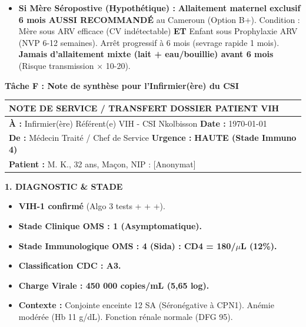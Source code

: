 \documentclass[11pt]{article}
\begin{document}
\begin{exoresolu}
\begin{enumerate}
\begin{itemize}
        \item \textbf{Si Mère Séropostive (Hypothétique) :} \textbf{Allaitement maternel exclusif 6 mois AUSSI RECOMMANDÉ} au Cameroun (Option B+). Condition : Mère sous ARV efficace (CV indétectable) \textbf{ET} Enfant sous Prophylaxie ARV (NVP 6-12 semaines). Arrêt progressif à 6 mois (sevrage rapide 1 mois). \textbf{Jamais d'allaitement mixte (lait + eau/bouillie) avant 6 mois} (Risque transmission $\times$ 10-20).
    \end{itemize}
\end{enumerate}

\noindent\textbf{Tâche F : Note de synthèse pour l'Infirmier(ère) du CSI}
\begin{center}
\begin{tabularx}{\linewidth}{|X|}\hline
\rowcolor{popblueL}
\textbf{NOTE DE SERVICE / TRANSFERT DOSSIER PATIENT VIH} \\ \hline
\textbf{À :} Infirmier(ère) Référent(e) VIH - CSI Nkolbisson \hfill \textbf{Date :} \today \\
\textbf{De :} Médecin Traité / Chef de Service \hfill \textbf{Urgence :} \textbf{HAUTE (Stade Immuno 4)} \\
\textbf{Patient :} M. K., 32 ans, Maçon, NIP : [Anonymat] \\ \hline
\end{tabularx}
\end{center}

\vspace{0.3cm}
\noindent\textbf{1. DIAGNOSTIC \& STADE}
\begin{itemize}
    \item \textbf{VIH-1 confirmé} (Algo 3 tests + + +).
    \item \textbf{Stade Clinique OMS : 1 (Asymptomatique).}
    \item \textbf{Stade Immunologique OMS : 4 (Sida) : CD4 = 180/$\mu$L (12\%).}
    \item \textbf{Classification CDC : A3.}
    \item \textbf{Charge Virale : 450 000 copies/mL (5,65 log).}
    \item \textbf{Contexte :} Conjointe enceinte 12 SA (Séronégative à CPN1). Anémie modérée (Hb 11 g/dL). Fonction rénale normale (DFG 95).
\end{itemize}


\end{exoresolu}
\end{document}

